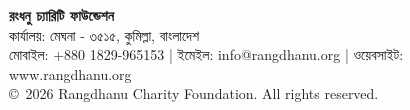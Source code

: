 \documentclass[11pt]{article}
\newcommand{\eng}[1]{{\engfont #1}}
\begin{document}
\vspace{0.08cm}

\begin{tcolorbox}[
    enhanced,
    colback=navyblue,
    colframe=navyblue,
    coltext=white,
    arc=0mm,
    boxrule=0mm,
    top=6pt, bottom=6pt, left=15pt, right=15pt
]
    \centering
    \fontsize{9.5}{13}\selectfont
    \textbf{রংধনু চ্যারিটি ফাউন্ডেশন} \\
    কার্যালয়: মেঘনা - ৩৫১৫, কুমিল্লা, বাংলাদেশ \\
    মোবাইল: \eng{+880 1829-965153} \quad | \quad ইমেইল: \eng{info@rangdhanu.org} \quad | \quad ওয়েবসাইট: \eng{www.rangdhanu.org} \\
    \vspace{0.05cm}
    \fontsize{7.5}{9.5}\selectfont \color{white!80} \eng{\copyright\ 2026 Rangdhanu Charity Foundation. All rights reserved.}
\end{tcolorbox}
\end{document}
